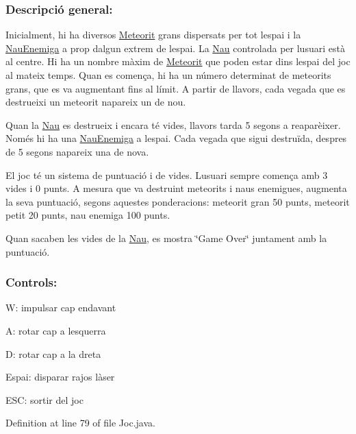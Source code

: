 \subsubsection*{Descripció general\+: }

Inicialment, hi ha diversos \hyperlink{class_meteorit}{Meteorit} grans dispersats per tot l\textquotesingle{}espai i la \hyperlink{class_nau_enemiga}{Nau\+Enemiga} a prop d\textquotesingle{}algun extrem de l\textquotesingle{}espai. La \hyperlink{class_nau}{Nau} controlada per l\textquotesingle{}usuari està al centre. Hi ha un nombre màxim de \hyperlink{class_meteorit}{Meteorit} que poden estar dins l\textquotesingle{}espai del joc al mateix temps. Quan es comença, hi ha un número determinat de meteorits grans, que es va augmentant fins al límit. A partir de llavors, cada vegada que es destrueixi un meteorit n\textquotesingle{}apareix un de nou.

Quan la \hyperlink{class_nau}{Nau} es destrueix i encara té vides, llavors tarda 5 segons a reaparèixer. Només hi ha una \hyperlink{class_nau_enemiga}{Nau\+Enemiga} a l\textquotesingle{}espai. Cada vegada que sigui destruïda, despres de 5 segons n\textquotesingle{}apareix una de nova.

El joc té un sistema de puntuació i de vides. L\textquotesingle{}usuari sempre comença amb 3 vides i 0 punts. A mesura que va destruint meteorits i naus enemigues, augmenta la seva puntuació, segons aquestes ponderacions\+: meteorit gran 50 punts, meteorit petit 20 punts, nau enemiga 100 punts.

Quan s\textquotesingle{}acaben les vides de la \hyperlink{class_nau}{Nau}, es mostra \char`\"{}\+Game Over\char`\"{} juntament amb la puntuació.

\subsubsection*{Controls\+: }


\begin{DoxyItemize}
\item W\+: impulsar cap endavant
\item A\+: rotar cap a l\textquotesingle{}esquerra
\item D\+: rotar cap a la dreta
\item Espai\+: disparar rajos làser
\item E\+S\+C\+: sortir del joc 
\end{DoxyItemize}

Definition at line 79 of file Joc.\+java.



